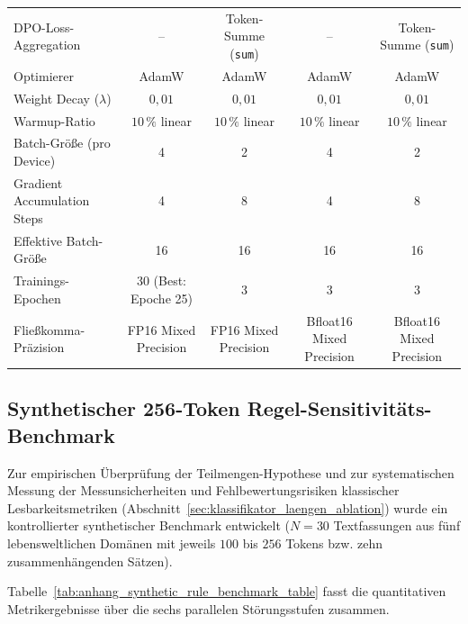 \begin{table}[htbp]
{\begin{tabular}{@{}lcccc@{}}
DPO-Loss-Aggregation & -- & Token-Summe (\texttt{sum}) & -- & Token-Summe (\texttt{sum}) \\
Optimierer & AdamW & AdamW & AdamW & AdamW \\
Weight Decay ($\lambda$) & $0{,}01$ & $0{,}01$ & $0{,}01$ & $0{,}01$ \\
Warmup-Ratio & $10\,\%$ linear & $10\,\%$ linear & $10\,\%$ linear & $10\,\%$ linear \\
Batch-Größe (pro Device) & 4 & 2 & 4 & 2 \\
Gradient Accumulation Steps & 4 & 8 & 4 & 8 \\
Effektive Batch-Größe & 16 & 16 & 16 & 16 \\
Trainings-Epochen & 30 (Best: Epoche 25) & 3 & 3 & 3 \\
Fließkomma-Präzision & FP16 Mixed Precision & FP16 Mixed Precision & Bfloat16 Mixed Precision & Bfloat16 Mixed Precision \\
\bottomrule
\end{tabular}}
\end{table}

\newpage
\subsection{Synthetischer 256-Token Regel-Sensitivitäts-Benchmark}
\label{sec:anhang_synthetic_rule_benchmark}

Zur empirischen Überprüfung der Teilmengen-Hypothese und zur systematischen Messung der Messunsicherheiten und Fehlbewertungsrisiken klassischer Lesbarkeitsmetriken (Abschnitt~\ref{sec:klassifikator_laengen_ablation}) wurde ein kontrollierter synthetischer Benchmark entwickelt ($N = 30$ Textfassungen aus fünf lebensweltlichen Domänen mit jeweils $100$ bis $256$ Tokens bzw. zehn zusammenhängenden Sätzen).

Tabelle~\ref{tab:anhang_synthetic_rule_benchmark_table} fasst die quantitativen Metrikergebnisse über die sechs parallelen Störungsstufen zusammen.

